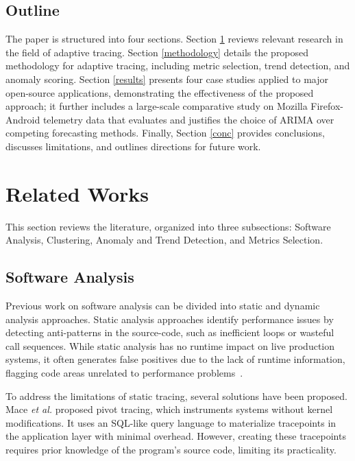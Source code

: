 \documentclass[pdflatex,sn-nature]{sn-jnl}%
\theoremstyle{thmstyleone}%
\theoremstyle{thmstyletwo}%
\theoremstyle{thmstylethree}%
\begin{document}
\subsection{Outline}
The paper is structured into four sections. Section \ref{rwork} reviews relevant research in the field of adaptive tracing. Section \ref{methodology} details the proposed methodology for adaptive tracing, including metric selection, trend detection, and anomaly scoring. Section \ref{results} presents four case studies applied to major open-source applications, demonstrating the effectiveness of the proposed approach; it further includes a large-scale comparative study on Mozilla Firefox-Android telemetry data that evaluates and justifies the choice of ARIMA over competing forecasting methods. Finally, Section \ref{conc} provides conclusions, discusses limitations, and outlines directions for future work.




\section{Related Works} \label{rwork}
This section reviews the literature, organized into three subsections: Software Analysis, Clustering, Anomaly and Trend Detection, and Metrics Selection.


\subsection{Software Analysis}
Previous work on software analysis can be divided into static and dynamic analysis approaches. Static analysis approaches \cite{unknown-author-no-date,unknown-author-no-dateB} identify performance issues by detecting anti-patterns in the source-code, such as inefficient loops or wasteful call sequences. While static analysis has no runtime impact on live production systems, it often generates false positives due to the lack of runtime information, flagging code areas unrelated to performance problems~\cite{jin2012understanding,nistor2015caramel,dai2018hytrace}.

To address the limitations of static tracing, several solutions have been proposed. Mace \textit{et al.} \cite{mace2015pivot} proposed pivot tracing, which instruments systems without kernel modifications. It uses an SQL-like query language to materialize tracepoints in the application layer with minimal overhead. However, creating these tracepoints requires prior knowledge of the program's source code, limiting its practicality. 
\end{document}
